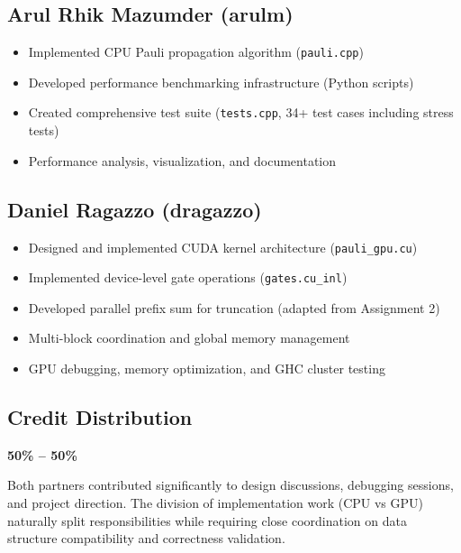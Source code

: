 \documentclass[11pt, a4paper]{article}
\begin{document}
\subsection{Arul Rhik Mazumder (arulm)}

\begin{itemize}
    \item Implemented CPU Pauli propagation algorithm (\texttt{pauli.cpp})
    \item Developed performance benchmarking infrastructure (Python scripts)
    \item Created comprehensive test suite (\texttt{tests.cpp}, 34+ test cases including stress tests)
    \item Performance analysis, visualization, and documentation
\end{itemize}

\subsection{Daniel Ragazzo (dragazzo)}

\begin{itemize}
    \item Designed and implemented CUDA kernel architecture (\texttt{pauli\_gpu.cu})
    \item Implemented device-level gate operations (\texttt{gates.cu\_inl})
    \item Developed parallel prefix sum for truncation (adapted from Assignment 2)
    \item Multi-block coordination and global memory management
    \item GPU debugging, memory optimization, and GHC cluster testing
\end{itemize}

\subsection{Credit Distribution}

\textbf{50\% -- 50\%}

\noindent Both partners contributed significantly to design discussions, debugging sessions, and project direction. The division of implementation work (CPU vs GPU) naturally split responsibilities while requiring close coordination on data structure compatibility and correctness validation.
\end{document}
